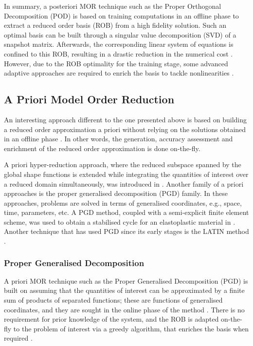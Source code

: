 In summary, a posteriori MOR technique such as the Proper Orthogonal Decomposition (POD) is based on training computations in an offline phase to extract a reduced order basis (ROB) from a high fidelity solution. Such an optimal basis can be built through a singular value decomposition (SVD) of a snapshot matrix. Afterwards, the corresponding linear system of equations is confined to this ROB, resulting in a drastic reduction in the numerical cost \parencite{chinesta2014separated,chinesta_encyclo_2018}. However, due to the ROB optimality for the training stage, some advanced adaptive approaches are required to enrich the basis to tackle nonlinearities \parencite{kerfriden2011bridging}.

\subsection{A Priori Model Order Reduction}
An interesting approach different to the one presented above is based on building a reduced order approximation a priori without relying on the solutions obtained in an offline phase \parencite{chinesta2013proper}. In other words, the generation, accuracy assessment and enrichment of the reduced order approximation is done on-the-fly.

A priori hyper-reduction approach, where the reduced subspace spanned by the global shape functions is extended while integrating the quantities of interest over a reduced domain simultaneously, was introduced in \parencite{ryckelynck2005priori,Ryckelynck2011}. Another family of a priori approaches is the proper generalised decomposition (PGD) family. In these approaches, problems are solved in terms of generalised coordinates, e.g., space, time, parameters, etc. A PGD method, coupled with a semi-explicit finite element scheme, was used to obtain a stabilised cycle for an elastoplastic material in \parencite{nasri2018proper}. Another technique that has used PGD since its early stages is the LATIN method \parencite{lad1999,Ladeveze2016227,chinesta2014separated}.
\smallskip
{}


\subsubsection{Proper Generalised Decomposition}
\label{pgdintro}
A priori MOR technique such as the Proper Generalised Decomposition (PGD) is built on assuming that the quantities of interest can be approximated by a finite sum of products of separated functions; these are functions of generalised coordinates, and they are sought in the online phase of the method \parencite{ladeveze1989large,chinesta2014separated}. There is no requirement for prior knowledge of the system, and the ROB is adapted on-the-fly to the problem of interest via a greedy algorithm, that enriches the basis when required \parencite{Ladeveze2016227,bha2017}.

